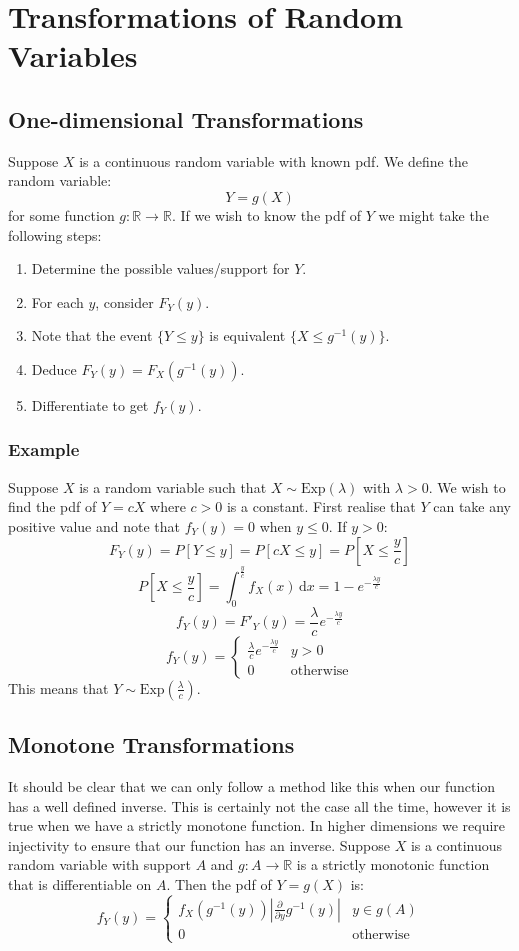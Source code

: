 \documentclass[12pt]{article}
\newcommand{\pf}[2]{\frac{\partial #1}{\partial #2}}
\begin{document}
\section{Transformations of Random Variables}
\subsection{One-dimensional Transformations}
Suppose \(X\) is a continuous random variable with known pdf. We define the random variable:
\[Y=g(X)\]
for some function \(g:\mathbb{R}\to\mathbb{R}\). If we wish to know the pdf of \(Y\) we might take the following steps:
\begin{enumerate}
    \item Determine the possible values/support for \(Y\).
    \item For each \(y\), consider \(F_Y(y)\).
    \item Note that the event \(\{Y\leq y\}\) is equivalent \(\{X\leq g^{-1}(y)\}\).
    \item Deduce \(F_Y(y)=F_X(g^{-1}(y))\).
    \item Differentiate to get \(f_Y(y)\).
\end{enumerate}
\subsubsection{Example}
Suppose \(X\) is a random variable such that \(X\sim\text{Exp}(\lambda)\) with \(\lambda >0\). We wish to find the pdf of \(Y=cX\) where \(c>0\) is a constant. First realise that \(Y\) can take any positive value and note that \(f_Y(y)=0\) when \(y\leq 0\). If \(y>0\):
\[F_Y(y)=P[Y\leq y]=P[cX\leq y]=P\left[X\leq \frac{y}{c}\right]\]
\[P\left[X\leq \frac{y}{c}\right]=\int^{\frac{y}{c}}_0f_X(x)\,\text{d}x=1-e^{-\frac{\lambda y}{c}}\]
\[f_Y(y)=F'_Y(y)=\frac{\lambda}{c}e^{-\frac{\lambda y}{c}}\]
\[f_Y(y)=\begin{cases}
    \frac{\lambda}{c}e^{-\frac{\lambda y}{c}}& y>0 \\
    0 & \text{otherwise}
\end{cases}\]
This means that \(Y\sim \text{Exp}\left(\frac{\lambda}{c}\right)\).
\subsection{Monotone Transformations}
It should be clear that we can only follow a method like this when our function has a well defined inverse. This is certainly not the case all the time, however it is true when we have a strictly monotone function. In higher dimensions we require injectivity to ensure that our function has an inverse. Suppose \(X\) is a continuous random variable with support \(A\) and \(g:A\to\mathbb{R}\) is a strictly monotonic function that is differentiable on \(A\). Then the pdf of \(Y=g(X)\) is:
\[f_Y(y)=\begin{cases}
    f_X(g^{-1}(y))\left|\pf{}{y}g^{-1}(y)\right| & y\in g(A) \\
    0&\text{otherwise}
\end{cases}\]
\end{document}

